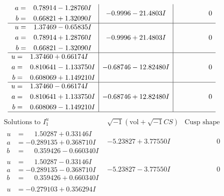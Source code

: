 \documentclass[1p]{elsarticle_modified}
\theoremstyle{definition}
\newcommand{\I}{\sqrt{-1}}
\begin{document}
$$\begin{array}{c|c|c}
\begin{aligned}
a &= \phantom{-}0.78914 - 1.28760 I \\
b &= \phantom{-}0.66821 + 1.32090 I\end{aligned}
 & -0.9996 - 21.4803 I & \phantom{-0.000000 } 0 \\ \hline\begin{aligned}
u &= \phantom{-}1.37469 - 0.65835 I \\
a &= \phantom{-}0.78914 + 1.28760 I \\
b &= \phantom{-}0.66821 - 1.32090 I\end{aligned}
 & -0.9996 + 21.4803 I & \phantom{-0.000000 } 0 \\ \hline\begin{aligned}
u &= \phantom{-}1.37460 + 0.66174 I \\
a &= \phantom{-}0.810641 - 1.133750 I \\
b &= \phantom{-}0.608069 + 1.149210 I\end{aligned}
 & -0.68746 - 12.82480 I & \phantom{-0.000000 } 0 \\ \hline\begin{aligned}
u &= \phantom{-}1.37460 - 0.66174 I \\
a &= \phantom{-}0.810641 + 1.133750 I \\
b &= \phantom{-}0.608069 - 1.149210 I\end{aligned}
 & -0.68746 + 12.82480 I & \phantom{-0.000000 } 0\\
 \hline 
 \end{array}$$\newpage$$\begin{array}{c|c|c}  
\text{Solutions to }I^u_{1}& \I (\text{vol} + \sqrt{-1}CS) & \text{Cusp shape}\\
 \hline 
\begin{aligned}
u &= \phantom{-}1.50287 + 0.33146 I \\
a &= -0.289135 + 0.368710 I \\
b &= \phantom{-}0.359426 - 0.660340 I\end{aligned}
 & -5.23827 + 3.77550 I & \phantom{-0.000000 } 0 \\ \hline\begin{aligned}
u &= \phantom{-}1.50287 - 0.33146 I \\
a &= -0.289135 - 0.368710 I \\
b &= \phantom{-}0.359426 + 0.660340 I\end{aligned}
 & -5.23827 - 3.77550 I & \phantom{-0.000000 } 0 \\ \hline\begin{aligned}
u &= -0.279103 + 0.356294 I \\

\end{aligned}
\end{array}$$
\end{document}
